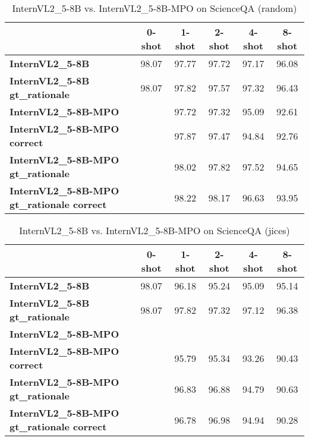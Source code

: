 \begin{table}
\caption{InternVL2\_5-8B vs. InternVL2\_5-8B-MPO on ScienceQA (random)}
\label{tab:InternVL2_5-8B_ScienceQA_TRAIN_random}
\begin{tabular}{lccccc}
\toprule
 & 0-shot & 1-shot & 2-shot & 4-shot & 8-shot \\
\midrule
\textbf{InternVL2\_5-8B} & 98.07 & 97.77 & 97.72 & 97.17 & 96.08 \\
\textbf{InternVL2\_5-8B gt\_rationale} & 98.07 & 97.82 & 97.57 & 97.32 & 96.43 \\
\textbf{InternVL2\_5-8B-MPO} &  & 97.72 & 97.32 & 95.09 & 92.61 \\
\textbf{InternVL2\_5-8B-MPO correct} &  & 97.87 & 97.47 & 94.84 & 92.76 \\
\textbf{InternVL2\_5-8B-MPO gt\_rationale} &  & 98.02 & 97.82 & 97.52 & 94.65 \\
\textbf{InternVL2\_5-8B-MPO gt\_rationale correct} &  & 98.22 & 98.17 & 96.63 & 93.95 \\
\bottomrule
\end{tabular}
\end{table}


\begin{table}
\caption{InternVL2\_5-8B vs. InternVL2\_5-8B-MPO on ScienceQA (jices)}
\label{tab:InternVL2_5-8B_ScienceQA_TRAIN_jices}
\begin{tabular}{lccccc}
\toprule
 & 0-shot & 1-shot & 2-shot & 4-shot & 8-shot \\
\midrule
\textbf{InternVL2\_5-8B} & 98.07 & 96.18 & 95.24 & 95.09 & 95.14 \\
\textbf{InternVL2\_5-8B gt\_rationale} & 98.07 & 97.82 & 97.32 & 97.12 & 96.38 \\
\textbf{InternVL2\_5-8B-MPO} &  &  &  &  &  \\
\textbf{InternVL2\_5-8B-MPO correct} &  & 95.79 & 95.34 & 93.26 & 90.43 \\
\textbf{InternVL2\_5-8B-MPO gt\_rationale} &  & 96.83 & 96.88 & 94.79 & 90.63 \\
\textbf{InternVL2\_5-8B-MPO gt\_rationale correct} &  & 96.78 & 96.98 & 94.94 & 90.28 \\
\bottomrule
\end{tabular}
\end{table}


